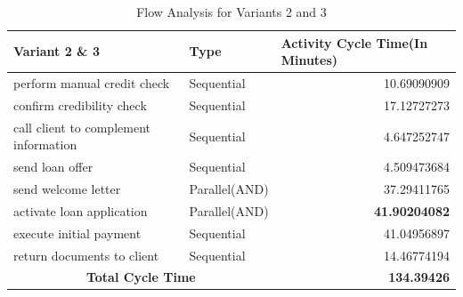 \documentclass[a4paper]{article} %
\begin{document}
\begin{table}[H]
  \centering
  
    \begin{tabular}{|c|c|r|}
    \hline
    \multicolumn{1}{|l|}{Variant 2 \& 3} & \multicolumn{1}{l|}{Type} & \multicolumn{1}{l|}{Activity Cycle Time(In Minutes)} \bigstrut\\
    \hline
    \multicolumn{1}{|l|}{perform manual credit check} & \multicolumn{1}{l|}{Sequential} & 10.69090909 \bigstrut\\
    \hline
    \multicolumn{1}{|l|}{confirm credibility check} & \multicolumn{1}{l|}{Sequential} & 17.12727273 \bigstrut\\
    \hline
    \multicolumn{1}{|l|}{call client to complement information} & \multicolumn{1}{l|}{Sequential} & 4.647252747 \bigstrut\\
    \hline
    \multicolumn{1}{|l|}{send loan offer} & \multicolumn{1}{l|}{Sequential} & 4.509473684 \bigstrut\\
    \hline
    \multicolumn{1}{|l|}{send welcome letter} & \multicolumn{1}{l|}{Parallel(AND)} & 37.29411765 \bigstrut\\
    \hline
    \multicolumn{1}{|l|}{activate loan application} & \multicolumn{1}{l|}{Parallel(AND)} & \textbf{41.90204082} \bigstrut\\
    \hline
    \multicolumn{1}{|l|}{execute initial payment} & \multicolumn{1}{l|}{Sequential} & 41.04956897 \bigstrut\\
    \hline
    \multicolumn{1}{|l|}{return documents to client} & \multicolumn{1}{l|}{Sequential} & 14.46774194 \bigstrut\\
    \hline
    \multicolumn{2}{|c|}{\textbf{Total Cycle Time}} & \textbf{134.39426} \bigstrut\\
    \hline
    \end{tabular}%
    \caption{Flow Analysis for Variants 2 and 3}
  \label{tab:addlabel}%
\end{table}%
\end{document}
